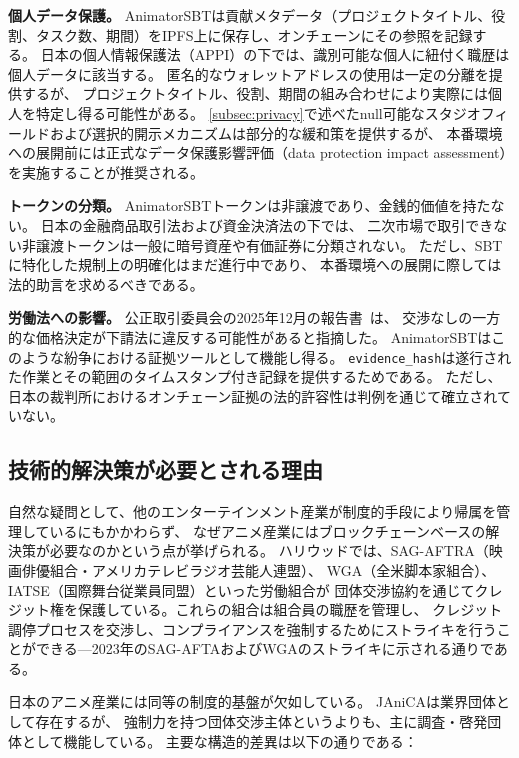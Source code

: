 \textbf{個人データ保護。}
AnimatorSBTは貢献メタデータ（プロジェクトタイトル、役割、タスク数、期間）をIPFS上に保存し、オンチェーンにその参照を記録する。
日本の個人情報保護法（APPI）の下では、識別可能な個人に紐付く職歴は個人データに該当する。
匿名的なウォレットアドレスの使用は一定の分離を提供するが、
プロジェクトタイトル、役割、期間の組み合わせにより実際には個人を特定し得る可能性がある。
\cref{subsec:privacy}で述べたnull可能なスタジオフィールドおよび選択的開示メカニズムは部分的な緩和策を提供するが、
本番環境への展開前には正式なデータ保護影響評価（data protection impact assessment）を実施することが推奨される。

\textbf{トークンの分類。}
AnimatorSBTトークンは非譲渡であり、金銭的価値を持たない。
日本の金融商品取引法および資金決済法の下では、
二次市場で取引できない非譲渡トークンは一般に暗号資産や有価証券に分類されない。
ただし、SBTに特化した規制上の明確化はまだ進行中であり、
本番環境への展開に際しては法的助言を求めるべきである。

\textbf{労働法への影響。}
公正取引委員会の2025年12月の報告書~\cite{jftc2025anime}は、
交渉なしの一方的な価格決定が下請法に違反する可能性があると指摘した。
AnimatorSBTはこのような紛争における証拠ツールとして機能し得る。
\texttt{evidence\_hash}は遂行された作業とその範囲のタイムスタンプ付き記録を提供するためである。
ただし、日本の裁判所におけるオンチェーン証拠の法的許容性は判例を通じて確立されていない。

\subsection{技術的解決策が必要とされる理由}
\label{subsec:why_japan}

自然な疑問として、他のエンターテインメント産業が制度的手段により帰属を管理しているにもかかわらず、
なぜアニメ産業にはブロックチェーンベースの解決策が必要なのかという点が挙げられる。
ハリウッドでは、SAG-AFTRA（映画俳優組合・アメリカテレビラジオ芸能人連盟）、
WGA（全米脚本家組合）、
IATSE（国際舞台従業員同盟）といった労働組合が
団体交渉協約を通じてクレジット権を保護している。これらの組合は組合員の職歴を管理し、
クレジット調停プロセスを交渉し、コンプライアンスを強制するためにストライキを行うことができる---2023年のSAG-AFTAおよびWGAのストライキに示される通りである。

日本のアニメ産業には同等の制度的基盤が欠如している。
JAniCAは業界団体として存在するが、
強制力を持つ団体交渉主体というよりも、主に調査・啓発団体として機能している。
主要な構造的差異は以下の通りである：

